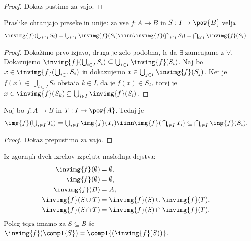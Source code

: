\begin{proof}
  Dokaz pustimo za vajo.
\end{proof}

\begin{izrek}
  Praslike ohranjajo preseke in unije: za vse $f : A \to B$ in $S : I \to \pow{B}$ velja
  \begin{equation*}
    \textstyle
    \invimg{f} (\bigcup_{i \in I} S_i) = \bigcup_{i \in I} \invimg{f}(S_i)
    \iinn
    \invimg{f} (\bigcap_{i \in I} S_i) = \bigcap_{i \in I} \invimg{f}(S_i).
  \end{equation*}
\end{izrek}

\begin{proof}
  Dokažimo prvo izjavo, druga je zelo podobna, le da $\exists$ zamenjamo z $\forall$.
  Dokazujemo $\invimg{f} (\bigcup_{i \in I} S_i) \subseteq \bigcup_{i \in I} \invimg{f}(S_i)$.
  Naj bo $x \in \invimg{f} (\bigcup_{i \in I} S_i)$ in dokazujemo $x \in \bigcup_{j \in I} \invimg{f}(S_j)$.
  Ker je $f(x) \in \bigcup_{i \in I} S_i$ obstaja $k \in I$, da je $f(x) \in S_k$, torej je
  $x \in \invimg{f}(S_k) \subseteq \bigcup_{i \in I} \invimg{f}(S_i)$.
\end{proof}

\begin{izrek}
  Naj bo $f : A \to B$ in $T : I \to \pow{A}$. Tedaj je
  \begin{equation*}
    \textstyle
     \img{f} (\bigcup_{i \in I} T_i) = \bigcup_{i \in I} \img{f}(T_i)
     \iinn
     \img{f} (\bigcap_{i \in I} T_i) \subseteq \bigcap_{i \in I} \img{f}(S_i).
  \end{equation*}
\end{izrek}

\begin{proof}
  Dokaz prepustimo za vajo.
\end{proof}

\begin{vaja}
  Iz zgornjih dveh izrekov izpeljite naslednja dejstva:
  \begin{align*}
    \invimg{f}(\emptyset) &= \emptyset, \\
    \img{f}(\emptyset) &= \emptyset, \\
    \invimg{f}(B) &= A, \\
    \invimg{f}(S \cup T) &= \invimg{f}(S) \cup \invimg{f}(T), \\
    \invimg{f}(S \cap T) &= \invimg{f}(S) \cap \invimg{f}(T).
  \end{align*}
  Poleg tega imamo za $S \subseteq B$ še $\invimg{f}(\compl{S}) = \compl{(\invimg{f}(S))}$.
\end{vaja}
